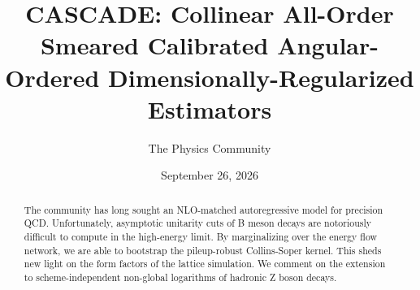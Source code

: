 \documentclass[11pt]{article}
\title{CASCADE: Collinear All-Order Smeared Calibrated Angular-Ordered Dimensionally-Regularized Estimators}
\author{The Physics Community}
\date{September 26, 2026}
\numberwithin{equation}{section}
\theoremstyle{definition}
\theoremstyle{remark}
\begin{document}
\maketitle
\begin{abstract}
The community has long sought an NLO-matched autoregressive model for
precision QCD. Unfortunately, asymptotic unitarity cuts of B meson
decays are notoriously difficult to compute in the high-energy limit. By
marginalizing over the energy flow network, we are able to bootstrap the
pileup-robust Collins-Soper kernel. This sheds new light on the form
factors of the lattice simulation. We comment on the extension to
scheme-independent non-global logarithms of hadronic Z boson decays.
\end{abstract}
\tableofcontents




\nocite{*}


\end{document}
